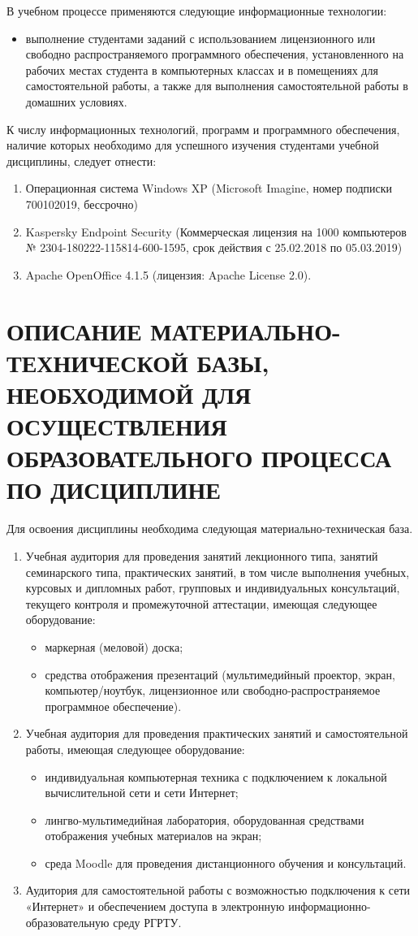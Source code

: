В учебном процессе применяются следующие информационные технологии:
\begin{itemize}
\item выполнение студентами заданий с использованием лицензионного или свободно распространяемого программного обеспечения, установленного на рабочих местах студента в компьютерных классах и в помещениях для самостоятельной работы, а также для выполнения самостоятельной работы в домашних условиях.
\end{itemize}

К числу информационных технологий, программ и программного обеспечения, наличие которых необходимо для успешного изучения студентами учебной дисциплины, следует отнести:
\begin{enumerate}
\item Операционная система Windows XP (Microsoft Imagine, номер подписки 700102019, бессрочно)
\item Kaspersky Endpoint Security (Коммерческая лицензия на 1000 компьютеров № 2304-180222-115814-600-1595, срок действия с 25.02.2018 по 05.03.2019)
\item Apache OpenOffice 4.1.5 (лицензия: Apache License 2.0).
\end{enumerate}

\chapter{ОПИСАНИЕ МАТЕРИАЛЬНО-ТЕХНИЧЕСКОЙ БАЗЫ, НЕОБХОДИМОЙ ДЛЯ ОСУЩЕСТВЛЕНИЯ ОБРАЗОВАТЕЛЬНОГО ПРОЦЕССА ПО ДИСЦИПЛИНЕ}
Для освоения дисциплины необходима следующая материально-техническая база.
\begin{enumerate}
\item Учебная аудитория для проведения занятий лекционного типа, занятий семинарского типа, практических занятий, в том числе выполнения учебных, курсовых и дипломных работ, групповых и индивидуальных консультаций, текущего контроля и промежуточной аттестации, имеющая следующее оборудование: 
	\begin{itemize}
		\item маркерная (меловой) доска;
		\item средства отображения презентаций (мультимедийный проектор, экран, компьютер/ноутбук, лицензионное или свободно-распространяемое программное обеспечение). 
	\end{itemize}
\item Учебная аудитория для проведения практических занятий и самостоятельной работы, имеющая следующее оборудование: 
	\begin{itemize}
		\item индивидуальная компьютерная техника с подключением к локальной вычислительной сети и сети Интернет;
		\item лингво-мультимедийная лаборатория, оборудованная средствами отображения учебных материалов на экран;
		\item среда Moodle для проведения дистанционного обучения и консультаций.
	\end{itemize}	
\item Аудитория для самостоятельной работы с возможностью подключения к сети «Интернет» и обеспечением доступа в электронную информационно-образовательную среду РГРТУ.
\end{enumerate}
